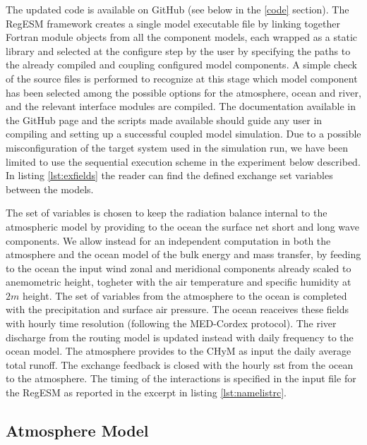 \documentclass[journal abbreviation, manuscript]{copernicus}
\begin{document}
The updated code is available on GitHub (see below in the \ref{code}
section). The RegESM framework creates a single model executable file by
linking together Fortran module objects from all the component models, each
wrapped as a static library and selected at the configure step by the user
by specifying the paths to the already compiled and coupling configured
model components. A simple check of the source files is performed to recognize
at this stage which model component has been selected among the possible
options for the atmosphere, ocean and river, and the relevant interface
modules are compiled. The documentation available in the GitHub page and
the scripts made available should guide any user in compiling and setting
up a successful coupled model simulation. Due to a possible misconfiguration
of the target system used in the simulation run, we have been limited to use
the sequential execution scheme in the experiment below described.
In listing \ref{lst:exfields} the reader can find the defined exchange
set variables between the models.



The set of variables is chosen to keep the radiation balance internal to
the atmospheric model by providing to the ocean the surface net short and
long wave components.
We allow instead for an independent computation in both the atmosphere and
the ocean model of the bulk energy and mass transfer, by feeding to the ocean
the input wind zonal and meridional components already scaled to anemometric
height, togheter with the air temperature and specific humidity at $2m$ height.
The set of variables from the atmosphere to the ocean is completed with the
precipitation and surface air pressure.
The ocean reaceives these fields with hourly time resolution (following the
MED-Cordex protocol). The river discharge from the routing model is updated
instead with daily frequency to the ocean model. The atmosphere provides
to the CHyM as input the daily average total runoff. The exchange feedback
is closed with the hourly sst from the ocean to the atmosphere.
The timing of the interactions is specified in the input file for the RegESM
as reported in the excerpt in listing \ref{lst:namelistrc}.



\subsection{Atmosphere Model}
\end{document}
